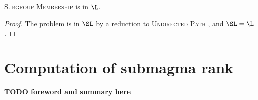 \documentclass{article}
\newcommand{\todo}[1]{\textbf{TODO #1}}
\newcommand{\gen}[1]{\langle #1 \rangle}
\DeclareMathOperator{\rank}{rank}
\begin{document}
\begin{lemma}\label{lem:subgroupmem}
  \textsc{Subgroup Membership} is in $\L$.
\end{lemma}
\begin{proof}
  The problem is in $\SL$ by a reduction to \textsc{Undirected Path} \autocite[Section~3]{bm89}, and $\SL = \L$ \cite{reingold08}.
\end{proof}

\section{Computation of submagma rank}

\todo{foreword and summary here}




\end{document}
